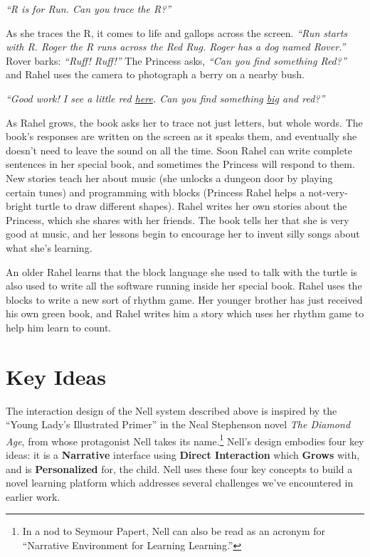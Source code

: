 \documentclass{sig-alternate}
\begin{document}
\textit{``R is for Run.  Can you trace the R?''}

As she traces the R, it comes to life and gallops across the screen.
\textit{``Run starts with R.  Roger the R runs across the Red Rug.
Roger has a dog named Rover.''}  Rover barks: \textit{``Ruff! Ruff!''}  The
Princess asks, \textit{``Can you find something Red?''} and Rahel uses the
camera to photograph a berry on a nearby bush.

\emph{``Good work!  I see a little red \underline{here}.  Can you find
something \underline{big} and red?''}

As Rahel grows, the book asks her to trace not just letters, but whole
words.  The book's responses are written on the screen as it speaks
them, and eventually she doesn't need to leave the sound on all the
time.  Soon Rahel can write complete sentences in her special book,
and sometimes the Princess will respond to them.  New stories teach her about
music (she unlocks a dungeon door by playing certain tunes) and
programming with blocks (Princess Rahel helps a not-very-bright turtle
to draw different shapes).  Rahel writes her own stories about the Princess,
which she shares with her friends.  The book tells her that she is
very good at music, and her lessons begin to encourage her to invent
silly songs about what she's learning.

An older Rahel learns that the block language she used to talk with
the turtle is also used to write all the software running inside
her special book.  Rahel uses the blocks to write a new sort of rhythm
game.  Her younger brother has just received his own green book,
and Rahel writes him a story which uses her rhythm game to help him learn
to count.

\section{Key Ideas}
The interaction design of the Nell system described above is inspired
by the ``Young Lady's Illustrated Primer'' in the Neal Stephenson
novel \textit{The Diamond Age}, from whose protagonist Nell takes its
name.\footnote{In a nod to Seymour Papert, Nell can also be read as an
acronym for ``Narrative Environment for Learning Learning.''}
Nell's design embodies four key ideas: it is a \textbf{Narrative}
interface using \textbf{Direct Interaction} which \textbf{Grows} with,
and is \textbf{Personalized} for, the child.
Nell uses these four key concepts to build a novel learning platform
which addresses several challenges we've encountered in earlier work.
\end{document}
